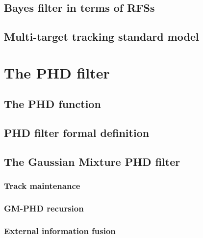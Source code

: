 \documentclass[english,master,unicode]{ctufit-thesis}
\theoremstyle{plain}
\theoremstyle{definition}
\theoremstyle{remark}
\numberwithin{theorem}{chapter}
\begin{document}
        \subsection{Bayes filter in terms of RFSs}\label{sec:bayes-filter-rfs}
            
        \subsection{Multi-target tracking standard model}\label{sec:mtt-standard-model}
            
    \section{The PHD filter}\label{sec:phd-filter}
        
        \subsection{The PHD function}\label{sec:phd-function}
            
        \subsection{PHD filter formal definition}\label{sec:phd-filter-formal}
            
        \subsection{The Gaussian Mixture PHD filter}\label{sec:gm-phd}
            
            \subsubsection{Track maintenance}\label{sec:track-maintenance}
                
            \subsubsection{GM-PHD recursion}\label{sec:gm-phd-recursion}
                
            \subsubsection{External information fusion}\label{sec:gm-phd-fusion}
                
\end{document}
